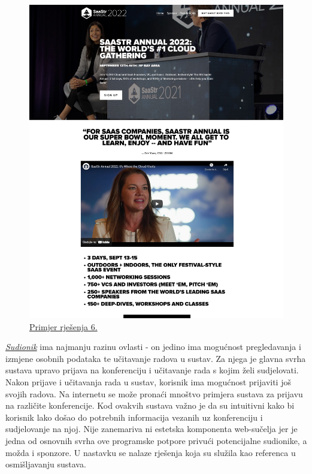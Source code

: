 \begin{figure}[H]
\begin{minipage}[t]{0.4\textwidth}
				\includegraphics[width=\linewidth]{slike/frontpage_example6}
				\caption{\href{https://www.saastrannual2022.com//}{Primjer rješenja 6.}} \label{fig:frontpage_example6}
			\end{minipage}
		\end{figure}
		
	

		\underline{\textit{Sudionik}} ima najmanju razinu ovlasti - on jedino ima mogućnost pregledavanja i izmjene osobnih podataka te učitavanje radova u sustav. Za njega je glavna svrha sustava upravo prijava na konferenciju i učitavanje rada s kojim želi sudjelovati. Nakon prijave i učitavanja rada u sustav, korisnik ima mogućnost prijaviti još svojih radova.
		\newline
		\newline
		Na internetu se može pronaći mnoštvo primjera sustava za prijavu na različite konferencije. Kod ovakvih sustava važno je da su intuitivni kako bi korisnik lako došao do potrebnih informacija vezanih uz konferenciju i sudjelovanje na njoj. Nije zanemariva ni estetska komponenta web-sučelja jer je jedna od osnovnih svrha ove programske potpore privući potencijalne sudionike, a možda i sponzore. U nastavku se nalaze rješenja koja su služila kao referenca u osmišljavanju sustava.
		\newline
		\newline
		
